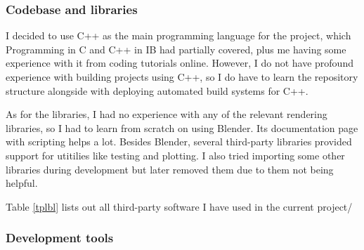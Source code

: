 \documentclass[12pt,a4paper,twoside,openright]{report}
\begin{document}
\subsubsection{Codebase and libraries}

I decided to use C++ as the main programming language for the project, which Programming in C and C++ in IB had partially covered, plus me having some experience with it from coding tutorials online. However, I do not have profound experience with building projects using C++, so I do have to learn the repository structure alongside with deploying automated build systems for C++.

As for the libraries, I had no experience with any of the relevant rendering libraries, so I had to learn from scratch on using Blender\cite{blender}. Its documentation page with scripting\cite{blenderdoc} helps a lot. Besides Blender, several third-party libraries provided support for utitilies like testing and plotting. I also tried importing some other libraries during development but later removed them due to them not being helpful.

Table \ref{tplbl} lists out all third-party software I have used in the current project/

\begin{table}[h]
    \centering
    \caption{List of Third-Party Software Used}
    \label{tab:third_party_software}
    \label{tplbl}
\end{table}

\subsubsection{Development tools}
\end{document}
